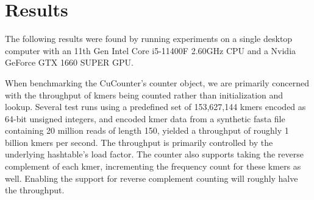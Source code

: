 \section*{Results}
The following results were found by running experiments on a single desktop computer with an 11th Gen Intel Core i5-11400F 2.60GHz CPU and a Nvidia GeForce GTX 1660 SUPER GPU.

When benchmarking the CuCounter's counter object, we are primarily concerned with the throughput of kmers being counted rather than initialization and lookup. 
Several test runs using a predefined set of 153,627,144 kmers encoded as 64-bit unsigned integers, and encoded kmer data from a synthetic fasta file containing 20 million reads of length 150, yielded a throughput of roughly 1 billion kmers per second.
The throughput is primarily controlled by the underlying hashtable's load factor. The counter also supports taking the reverse complement of each kmer, incrementing the frequency count for these kmers as well. 
Enabling the support for reverse complement counting will roughly halve the throughput.

